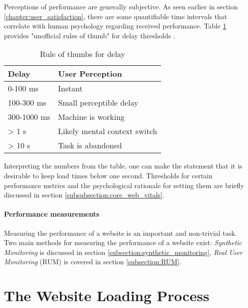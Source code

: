 Perceptions of performance are generally subjective.
As seen earlier in section \ref{chapter:user_satisfaction}, there are some quantifiable time intervals that correlate with human psychology regarding received performance.
Table \ref{table:perception} provides "unofficial rules of thumb" for delay thresholds \cite{2013Grigorik}.

\begin{table}[h]
	\small
	\centering
	\begin{tabular}{| l | l | }
	\hline
	Delay \cellcolor{lightgrey} & User Perception \cellcolor{lightgrey} \\
	\hline
	0-100 ms & Instant \\
	100-300 ms & Small perceptible delay \\
	300-1000 ms & Machine is working \\
	> 1 s & Likely mental context switch \\
	> 10 s & Task is abandoned \\
	\hline
	\end{tabular}
	\medskip
	\caption{Rule of thumbs for delay}
	\label{table:perception}
\end{table}

Interpreting the numbers from the table, one can make the statement that it is desirable to keep load times below one second.
Thresholds for certain performance metrics and the psychological rationale for setting them are briefly discussed in section \ref{subsubsection:core_web_vitals}.




\paragraph{Performance measurements}

Measuring the performance of a website is an important and non-trivial task.
Two main methods for measuring the performance of a website exist:
\textit{Synthetic Monitoring} is discussed in section \ref{subsection:synthetic_monitoring},
\textit{Real User Monitoring} (RUM) is covered in section \ref{subsection:RUM}.







\section{The Website Loading Process} %
\label{section:website_loading_process}


